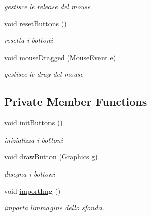 \begin{DoxyCompactItemize}
\begin{DoxyCompactList}\small\item\em gestisce le release del mouse \end{DoxyCompactList}\item 
void \hyperlink{classscenes_1_1_menu_a548cf4795e9d559d0c0cce0bb57a5251}{reset\+Buttons} ()
\begin{DoxyCompactList}\small\item\em resetta i bottoni \end{DoxyCompactList}\item 
void \hyperlink{classscenes_1_1_menu_adbfc0588c017133c9b7070474402b72f}{mouse\+Dragged} (Mouse\+Event e)
\begin{DoxyCompactList}\small\item\em gestisce le drag del mouse \end{DoxyCompactList}\end{DoxyCompactItemize}
\subsection*{Private Member Functions}
\begin{DoxyCompactItemize}
\item 
void \hyperlink{classscenes_1_1_menu_a27d3ba5afb772cc36c9a432c28975ace}{init\+Buttons} ()
\begin{DoxyCompactList}\small\item\em inizializza i bottoni \end{DoxyCompactList}\item 
void \hyperlink{classscenes_1_1_menu_a65768678909bc0512c6cb9780709ad38}{draw\+Button} (Graphics g)
\begin{DoxyCompactList}\small\item\em disegna i bottoni \end{DoxyCompactList}\item 
void \hyperlink{classscenes_1_1_menu_ababe61393d9a835b23b1fd6675da3914}{import\+Img} ()
\begin{DoxyCompactList}\small\item\em importa l\textquotesingle{}immagine dello sfondo. \end{DoxyCompactList}\end{DoxyCompactItemize}
